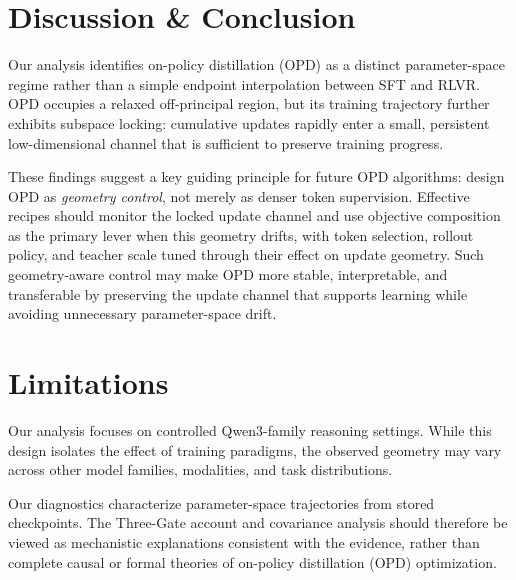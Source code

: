 \documentclass{llmxive}
\begin{document}


\section{Discussion \& Conclusion}
\label{sec:discussion}

Our analysis identifies on-policy distillation (OPD) as a distinct parameter-space regime rather than a simple endpoint interpolation between SFT and RLVR. OPD occupies a relaxed off-principal region, but its training trajectory further exhibits subspace locking: cumulative updates rapidly enter a small, persistent low-dimensional channel that is sufficient to preserve training progress.

These findings suggest a key guiding principle for future OPD algorithms:
design OPD as \emph{geometry control}, not merely as denser token
supervision. Effective recipes should monitor the locked update channel and
use objective composition as the primary lever when this geometry drifts,
with token selection, rollout policy, and teacher scale tuned through their
effect on update geometry. Such geometry-aware control may make OPD more
stable, interpretable, and transferable by preserving the update channel
that supports learning while avoiding unnecessary parameter-space drift.
\section*{Limitations}

Our analysis focuses on controlled Qwen3-family reasoning settings. While
this design isolates the effect of training paradigms, the observed geometry
may vary across other model families, modalities, and task distributions.

Our diagnostics characterize parameter-space trajectories from stored
checkpoints. The Three-Gate account and covariance analysis should therefore
be viewed as mechanistic explanations consistent with the evidence, rather
than complete causal or formal theories of on-policy distillation (OPD) optimization.



\end{document}
